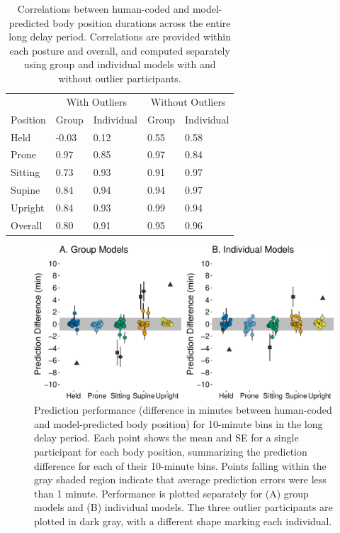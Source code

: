 \documentclass[
  man]{apa6}
\begin{document}
\begin{table}[tbp]

\begin{center}
\begin{threeparttable}

\caption{\label{tab:pt2overalltable}Correlations between human-coded and model-predicted body position durations across the entire long delay period. Correlations are provided within each posture and overall, and computed separately using group and individual models with and without outlier participants.}

\begin{tabular}{lllll}
\toprule
 & \multicolumn{2}{c}{With Outliers} & \multicolumn{2}{c}{Without Outliers} \\
\cmidrule(r){2-3} \cmidrule(r){4-5}
Position & Group & Individual & Group & Individual\\
\midrule
Held & -0.03 & 0.12 & 0.55 & 0.58\\
Prone & 0.97 & 0.85 & 0.97 & 0.84\\
Sitting & 0.73 & 0.93 & 0.91 & 0.97\\
Supine & 0.84 & 0.94 & 0.94 & 0.97\\
Upright & 0.84 & 0.93 & 0.99 & 0.94\\ \midrule
Overall & 0.80 & 0.91 & 0.95 & 0.96\\
\bottomrule
\end{tabular}

\end{threeparttable}
\end{center}

\end{table}

\begin{figure}

{\centering \includegraphics{manuscript_files/figure-latex/part2bins-1} 

}

\caption{Prediction performance (difference in minutes between human-coded and model-predicted body position) for 10-minute bins in the long delay period. Each point shows the mean and SE for a single participant for each body position, summarizing the prediction difference for each of their 10-minute bins. Points falling within the gray shaded region indicate that average prediction errors were less than 1 minute. Performance is plotted separately for (A) group models and (B) individual models. The three outlier participants are plotted in dark gray, with a different shape marking each individual.}\label{fig:part2bins}
\end{figure}
\end{document}
